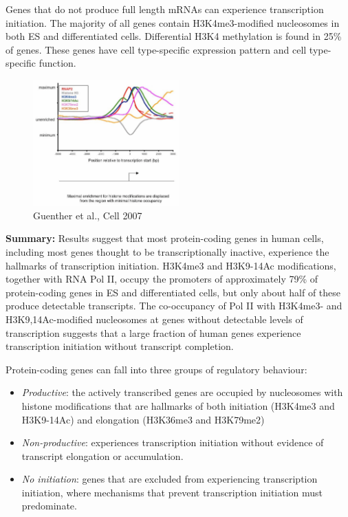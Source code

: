 Genes that do not produce full length mRNAs can experience transcription initiation. The majority of all genes contain H3K4me3-modified nucleosomes in both ES and differentiated cells. Differential H3K4 methylation is found in 25\% of genes. These genes have cell type-specific expression pattern and cell type-specific function.

\begin{figure}
\centering
\includegraphics[width=0.5\textwidth]{../_resources/Screenshot_2022-09-22_at_21-49-05.png}
\caption{Guenther et al., Cell 2007}
\end{figure}

\textbf{Summary:} Results suggest that most protein-coding genes in human cells, including most genes thought to be transcriptionally inactive, experience the hallmarks of transcription initiation. H3K4me3 and H3K9-14Ac modifications, together with RNA Pol II, occupy the promoters of approximately 79\% of protein-coding genes in ES and differentiated cells, but only about half of these produce detectable transcripts. The co-occupancy of Pol II with H3K4me3- and H3K9,14Ac-modified nucleosomes at genes without detectable levels of transcription suggests that a large fraction of human genes experience transcription initiation without transcript completion.

Protein-coding genes can fall into three groups of regulatory behaviour:

\begin{itemize}
\tightlist
\item
  \emph{Productive}: the actively transcribed genes are occupied by nucleosomes with histone modifications that are hallmarks of both initiation (H3K4me3 and H3K9-14Ac) and elongation (H3K36me3 and H3K79me2)
\item
  \emph{Non-productive}: experiences transcription initiation without evidence of transcript elongation or accumulation.
\item
  \emph{No initiation}: genes that are excluded from experiencing transcription initiation, where mechanisms that prevent transcription initiation must predominate.
\end{itemize}

